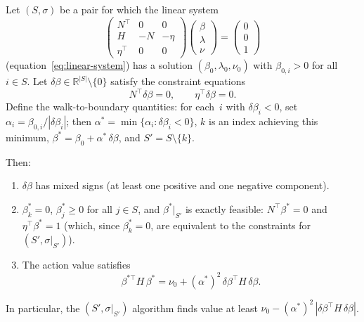 \begin{lemma}%
\label{lem:constraint-direction-dismissal}
Let $(S, \sigma)$ be a pair for which the linear system
\[
  \begin{pmatrix} N^\top & 0 & 0 \\ H & -N & -\eta \\ \eta^\top & 0 & 0 \end{pmatrix}
  \begin{pmatrix} \beta \\ \lambda \\ \nu \end{pmatrix}
  = \begin{pmatrix} 0 \\ 0 \\ 1 \end{pmatrix}
\]
(equation~\eqref{eq:linear-system}) has a solution
$(\beta_0, \lambda_0, \nu_0)$ with $\beta_{0,i} > 0$ for all
$i \in S$.
Let $\delta\beta \in \mathbb{R}^{|S|} \setminus \{0\}$ satisfy
the constraint equations
\[
  N^\top \delta\beta = 0, \qquad \eta^\top \delta\beta = 0.
\]
Define the walk-to-boundary quantities:
for each~$i$ with $\delta\beta_i < 0$, set
$\alpha_i = \beta_{0,i} / |\delta\beta_i|$; then
$\alpha^* = \min\{\alpha_i : \delta\beta_i < 0\}$,
$k$ is an index achieving this minimum,
$\beta^* = \beta_0 + \alpha^*\,\delta\beta$,
and $S' = S \setminus \{k\}$.

Then:
\begin{enumerate}
\item $\delta\beta$ has mixed signs
  (at least one positive and one negative component).
\item $\beta^*_k = 0$, $\beta^*_j \geq 0$ for all $j \in S$,
  and $\beta^*|_{S'}$ is exactly feasible:
  $N^\top \beta^* = 0$ and $\eta^\top \beta^* = 1$
  (which, since $\beta^*_k = 0$, are equivalent to
  the constraints for~$(S', \sigma|_{S'})$).
\item The action value satisfies
  \begin{equation}\label{eq:walk-q-formula}
    \beta^{*\top} H\, \beta^*
    = \nu_0 + (\alpha^*)^2\,
      \delta\beta^\top H\, \delta\beta.
  \end{equation}
\end{enumerate}
In particular, the $(S', \sigma|_{S'})$ algorithm finds value
at least $\nu_0 - (\alpha^*)^2\,
|\delta\beta^\top H\, \delta\beta|$.
\end{lemma}

